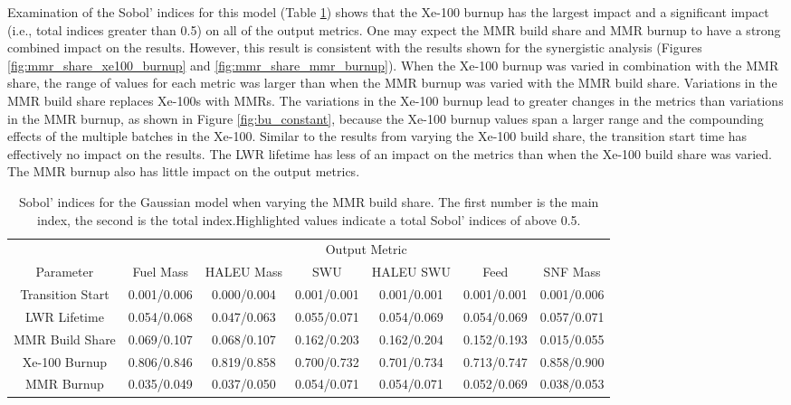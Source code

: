 Examination of the Sobol' indices for this model (Table \ref{tab:s7_sobol_mmr_gaussian})
shows that the Xe-100 burnup has the largest impact and a significant impact (i.e., 
total indices greater than 0.5) on all of the 
output metrics. One may expect the \gls{MMR} 
build share and \gls{MMR} burnup to have a strong combined impact on 
the results. However, this result is consistent with the results 
shown for the synergistic analysis (Figures \ref{fig:mmr_share_xe100_burnup} and 
\ref{fig:mmr_share_mmr_burnup}). When the Xe-100 burnup was varied in combination 
with the \gls{MMR} share, the range of values for each metric was larger than 
when the \gls{MMR} burnup was varied with the \gls{MMR} build share. Variations 
in the \gls{MMR} build share replaces Xe-100s with \glspl{MMR}. The variations 
in the Xe-100 burnup lead to greater changes in the metrics than variations 
in the \gls{MMR} burnup, as shown in Figure \ref{fig:bu_constant}, because 
the Xe-100 burnup values span a larger range and the compounding effects of the 
multiple batches in the Xe-100. 
Similar to the results from varying the Xe-100 build share, the 
transition start time has effectively no impact on the results. The \gls{LWR} 
lifetime has less of an impact on the metrics than when the Xe-100 
build share was varied. The \gls{MMR} burnup also has little impact on the 
output metrics. 

\begin{table}
    \centering
    \caption{Sobol' indices for the Gaussian model when varying the MMR 
    build share. The first number is the main index, the second is the total 
    index.Highlighted 
    values indicate a total Sobol' indices of above 0.5.}
    \label{tab:s7_sobol_mmr_gaussian}
    \begin{tabular}{c c c c c c c}
        \hline
        & \multicolumn{6}{c}{Output Metric} \\
        Parameter & Fuel Mass & HALEU Mass & SWU & HALEU SWU & Feed & SNF Mass \\
        \hline
        Transition Start & 0.001/0.006 & 0.000/0.004 & 0.001/0.001 &
                           0.001/0.001 & 0.001/0.001 & 0.001/0.006\\
        LWR Lifetime & 0.054/0.068 & 0.047/0.063 & 0.055/0.071 &
                       0.054/0.069 & 0.054/0.069 & 0.057/0.071\\
        MMR Build Share & 0.069/0.107 & 0.068/0.107 & 0.162/0.203 &
                          0.162/0.204 & 0.152/0.193 & 0.015/0.055\\
        Xe-100 Burnup & \cellcolor{green!25}0.806/0.846 & \cellcolor{green!25}0.819/0.858 & \cellcolor{green!25}0.700/0.732 &
        \cellcolor{green!25}0.701/0.734 & \cellcolor{green!25}0.713/0.747 & \cellcolor{green!25}0.858/0.900\\
        MMR Burnup & 0.035/0.049 & 0.037/0.050 & 0.054/0.071 &
                     0.054/0.071 & 0.052/0.069 & 0.038/0.053\\
        \hline        
    \end{tabular}
\end{table}

